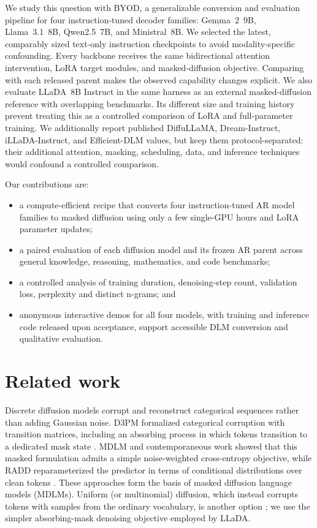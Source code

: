 \documentclass{article}
\newcommand{\method}{BYOD}
\begin{document}
We study this question with \method{}, a generalizable conversion and evaluation pipeline for four instruction-tuned decoder families: Gemma~2~9B, Llama~3.1~8B, Qwen2.5~7B, and Ministral~8B. We selected the latest, comparably sized text-only instruction checkpoints to avoid modality-specific confounding. Every backbone receives the same bidirectional attention intervention, LoRA target modules, and masked-diffusion objective. Comparing with each released parent makes the observed capability changes explicit. We also evaluate LLaDA~8B Instruct in the same harness as an external masked-diffusion reference with overlapping benchmarks. Its different size and training history prevent treating this as a controlled comparison of LoRA and full-parameter training. We additionally report published DiffuLLaMA, Dream-Instruct, iLLaDA-Instruct, and Efficient-DLM values, but keep them protocol-separated: their additional attention, masking, scheduling, data, and inference techniques would confound a controlled comparison.

Our contributions are:
\begin{itemize}
    \item a compute-efficient recipe that converts four instruction-tuned AR model families to masked diffusion using only a few single-GPU hours and LoRA parameter updates;
    \item a paired evaluation of each diffusion model and its frozen AR parent across general knowledge, reasoning, mathematics, and code benchmarks;
    \item a controlled analysis of training duration, denoising-step count, validation loss, perplexity and distinct n-grams; and
    \item anonymous interactive demos for all four models, with training and inference code released upon acceptance, support accessible DLM conversion and qualitative evaluation.
\end{itemize}

\section{Related work}

Discrete diffusion models corrupt and reconstruct categorical sequences rather than adding Gaussian noise. D3PM formalized categorical corruption with transition matrices, including an absorbing process in which tokens transition to a dedicated mask state \citep{austin2021structured}. MDLM and contemporaneous work showed that this masked formulation admits a simple noise-weighted cross-entropy objective, while RADD reparameterized the predictor in terms of conditional distributions over clean tokens \citep{sahoo2024simple,shi2024simplified,ou2024absorbing}. These approaches form the basis of masked diffusion language models (MDLMs). Uniform (or multinomial) diffusion, which instead corrupts tokens with samples from the ordinary vocabulary, is another option \citep{hoogeboom2021multinomial}; we use the simpler absorbing-mask denoising objective employed by LLaDA.
\end{document}
